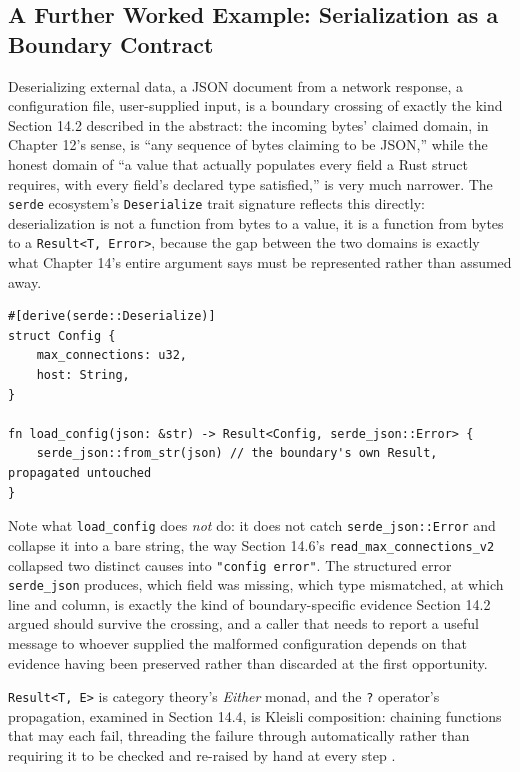 \documentclass[11pt]{book}
\begin{document}
\subsection*{A Further Worked Example: Serialization as a Boundary Contract}

Deserializing external data, a JSON document from a network response, a configuration file, user-supplied input, is a boundary crossing of exactly the kind Section 14.2 described in the abstract: the incoming bytes' claimed domain, in Chapter 12's sense, is ``any sequence of bytes claiming to be JSON,'' while the honest domain of ``a value that actually populates every field a Rust struct requires, with every field's declared type satisfied,'' is very much narrower. The \texttt{serde} ecosystem's \texttt{Deserialize} trait signature reflects this directly: deserialization is not a function from bytes to a value, it is a function from bytes to a \texttt{Result<T, Error>}, because the gap between the two domains is exactly what Chapter 14's entire argument says must be represented rather than assumed away.

\begin{lstlisting}
#[derive(serde::Deserialize)]
struct Config {
    max_connections: u32,
    host: String,
}

fn load_config(json: &str) -> Result<Config, serde_json::Error> {
    serde_json::from_str(json) // the boundary's own Result, propagated untouched
}
\end{lstlisting}

Note what \texttt{load\_config} does \emph{not} do: it does not catch \texttt{serde\_json::Error} and collapse it into a bare string, the way Section 14.6's \texttt{read\_max\_connections\_v2} collapsed two distinct causes into \texttt{"config error"}. The structured error \texttt{serde\_json} produces, which field was missing, which type mismatched, at which line and column, is exactly the kind of boundary-specific evidence Section 14.2 argued should survive the crossing, and a caller that needs to report a useful message to whoever supplied the malformed configuration depends on that evidence having been preserved rather than discarded at the first opportunity.

\begin{categorybox}
\texttt{Result<T, E>} is category theory's \emph{Either} monad, and the \texttt{?} operator's propagation, examined in Section 14.4, is Kleisli composition: chaining functions that may each fail, threading the failure through automatically rather than requiring it to be checked and re-raised by hand at every step \cite{milewski2019}.
\end{categorybox}
\end{document}
